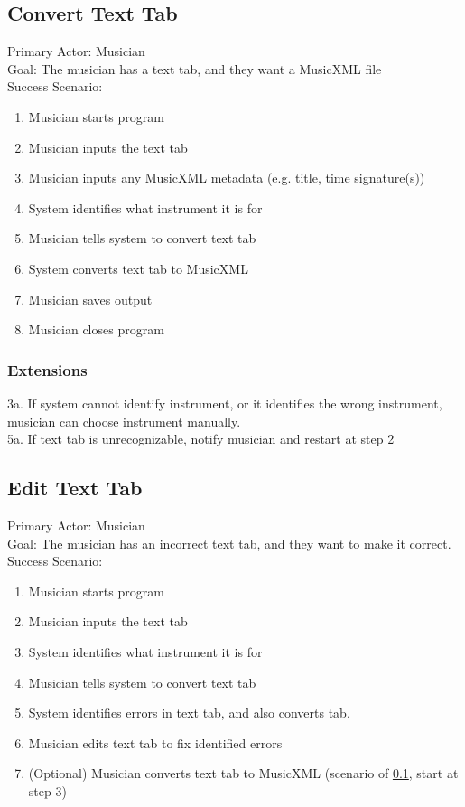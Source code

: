 \documentclass[11pt]{article}
\begin{document}
\subsection{Convert Text Tab}
\label{sec:orga753c67}
Primary Actor: Musician \\
Goal: The musician has a text tab, and they want a MusicXML file \\
Success Scenario:
\begin{enumerate}
\item Musician starts program
\item Musician inputs the text tab
\item Musician inputs any MusicXML metadata (e.g. title, time signature(s))
\item System identifies what instrument it is for
\item Musician tells system to convert text tab
\item System converts text tab to MusicXML
\item Musician saves output
\item Musician closes program
\end{enumerate}
\subsubsection{Extensions}
\label{sec:org926ed12}
3a. If system cannot identify instrument, or it identifies the wrong instrument, musician can choose instrument manually. \\
5a. If text tab is unrecognizable, notify musician and restart at step 2 \\
\subsection{Edit Text Tab}
\label{sec:org88b4d7f}
Primary Actor: Musician \\
Goal: The musician has an incorrect text tab, and they want to make it correct. \\
Success Scenario:
\begin{enumerate}
\item Musician starts program
\item Musician inputs the text tab
\item System identifies what instrument it is for
\item Musician tells system to convert text tab
\item System identifies errors in text tab, and also converts tab.
\item Musician edits text tab to fix identified errors
\item (Optional) Musician converts text tab to MusicXML (scenario of \ref{sec:orga753c67}, start at step 3)
\end{enumerate}
\end{document}
